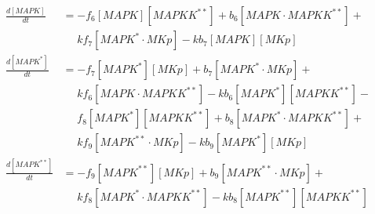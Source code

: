 \begin{equation*}
\begin{align*}
    \frac{d[MAPK]}{dt} &= -f_{6}[MAPK][MAPKK^{**}] + b_{6}[MAPK\cdot{}MAPKK^{**}] +\\
    &\phantom{=} kf_{7}[MAPK^{*}\cdot{}MKp] - kb_{7}[MAPK][MKp]\\ 
    \frac{d[MAPK^{*}]}{dt} &= -f_{7}[MAPK^{*}][MKp] + b_{7}[MAPK^{*}\cdot{}MKp] +\\
    &\phantom{=} kf_{6}[MAPK\cdot{}MAPKK^{**}] - kb_{6}[MAPK^{*}][MAPKK^{**}] -\\
    &\phantom{=} f_{8}[MAPK^{*}][MAPKK^{**}] + b_{8}[MAPK^{*}\cdot{}MAPKK^{**}] +\\
    &\phantom{=} kf_{9}[MAPK^{**}\cdot{}MKp] - kb_{9}[MAPK^{*}][MKp]\\
    \frac{d[MAPK^{**}]}{dt} &= -f_{9}[MAPK^{**}][MKp] + b_{9}[MAPK^{**}\cdot{}MKp] +\\
    &\phantom{=} kf_{8}[MAPK^{*}\cdot{}MAPKK^{**}] - kb_{8}[MAPK^{**}][MAPKK^{**}]\\
  \end{align*}
\end{equation*}
